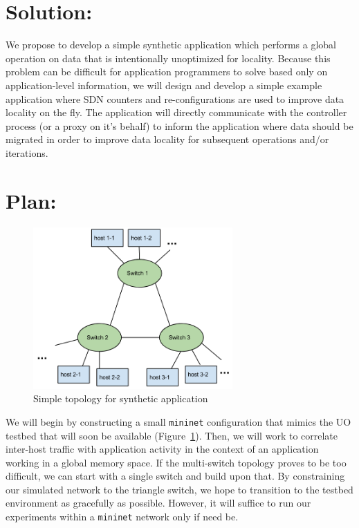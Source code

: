 \documentclass[12pt]{article}
\begin{document}
\section*{Solution:}
\label{solution}
We propose to develop a simple synthetic application which performs a global operation on data
that is intentionally unoptimized for locality.  Because this problem can be difficult for application
programmers to solve based only on application-level information, we will design and develop a simple
example application where SDN counters and re-configurations are used to improve data locality on the 
fly.  The application will directly communicate with the controller process (or a proxy on it's behalf)
to inform the application where data should be migrated in order to improve data locality for subsequent
operations and/or iterations.

\section*{Plan:}
\label{plan}
\begin{figure}[t]
\centerline{\includegraphics[width=3.0in]{img/topo.png}}
\caption{Simple topology for synthetic application}
\label{fig:topo}
\end{figure}
We will begin by constructing a small \texttt{mininet} configuration that mimics the UO testbed
that will soon be available (Figure~\ref{fig:topo}).  Then, we will work to correlate
inter-host traffic with application activity in the context of an application working in 
a global memory space.  If the multi-switch topology proves to be too difficult, we can 
start with a single switch and build upon that.  By constraining our simulated network to the
triangle switch, we hope to transition to the testbed environment as gracefully as possible.  However,
it will suffice to run our experiments within a \texttt{mininet} network only if need be.
\end{document}
